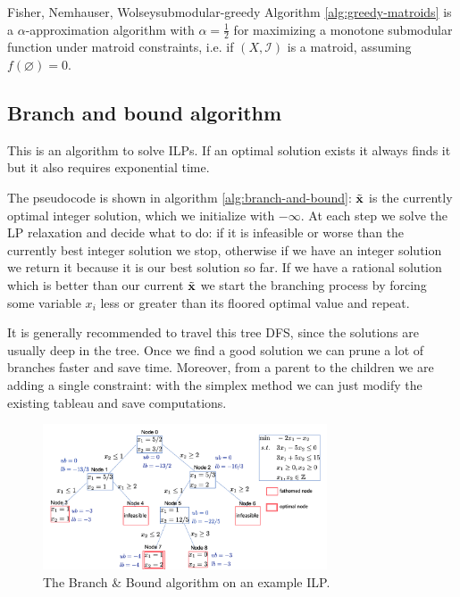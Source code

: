 \documentclass[12pt]{extarticle}
\renewcommand{\vec}[1]{\bvec{#1}}
\begin{document}
\begin{theorem}{Fisher, Nemhauser, Wolsey}{submodular-greedy}
	Algorithm \ref{alg:greedy-matroids} is a $\alpha$-approximation algorithm with
	$\alpha = \frac{1}{2}$ for maximizing a monotone submodular function under matroid constraints,
	i.e. if $(X, \mathcal I)$ is a matroid, assuming $f(\varnothing) = 0$.
\end{theorem}

\subsection{Branch and bound algorithm}

This is an algorithm to solve ILPs. If an optimal solution exists it always finds it but it also
requires exponential time.

The pseudocode is shown in algorithm \ref{alg:branch-and-bound}: $\tilde{\vec x}$ is the currently
optimal integer solution, which we initialize with $-\infty$. At each step we solve the LP
relaxation and decide what to do: if it is infeasible or worse than the currently best integer
solution we stop, otherwise if we have an integer solution we return it because it is our best
solution so far.
If we have a rational solution which is better than our current $\tilde{\vec x}$ we start the
branching process by forcing some variable $x_i$ less or greater than its floored optimal value and
repeat.

It is generally recommended to travel this tree DFS, since the  solutions are usually deep
in the tree. Once we find a good solution we can prune a lot of branches faster and save time.
Moreover, from a parent to the children we are adding a single constraint: with the simplex method
we can just modify the existing tableau and save computations.

\begin{figure}
	\centering
	\includegraphics[width=0.75\textwidth]{./assets/advanced-programming/branch-and-bound.png}
	\caption{The Branch \& Bound algorithm on an example ILP.}
\end{figure}
\end{document}
